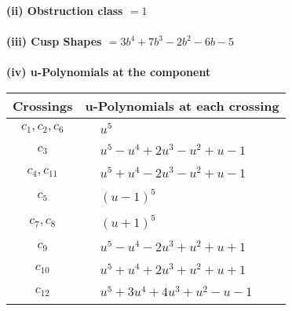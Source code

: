 \documentclass[1p]{elsarticle_modified}
\theoremstyle{definition}
\begin{document}
\flushleft \textbf{(ii) Obstruction class $= 1$}\\~\\
\flushleft \textbf{(iii) Cusp Shapes $= 3 b^4+7 b^3-2 b^2-6 b-5$}\\~\\
\newpage\renewcommand{\arraystretch}{1}
\flushleft \textbf{(iv) u-Polynomials at the component}\newline \\
\begin{tabular}{m{50pt}|m{274pt}}
Crossings & \hspace{64pt}u-Polynomials at each crossing \\
\hline $$\begin{aligned}c_{1},c_{2},c_{6}\end{aligned}$$&$\begin{aligned}
&u^5
\end{aligned}$\\
\hline $$\begin{aligned}c_{3}\end{aligned}$$&$\begin{aligned}
&u^5- u^4+2 u^3- u^2+u-1
\end{aligned}$\\
\hline $$\begin{aligned}c_{4},c_{11}\end{aligned}$$&$\begin{aligned}
&u^5+u^4-2 u^3- u^2+u-1
\end{aligned}$\\
\hline $$\begin{aligned}c_{5}\end{aligned}$$&$\begin{aligned}
&(u-1)^5
\end{aligned}$\\
\hline $$\begin{aligned}c_{7},c_{8}\end{aligned}$$&$\begin{aligned}
&(u+1)^5
\end{aligned}$\\
\hline $$\begin{aligned}c_{9}\end{aligned}$$&$\begin{aligned}
&u^5- u^4-2 u^3+u^2+u+1
\end{aligned}$\\
\hline $$\begin{aligned}c_{10}\end{aligned}$$&$\begin{aligned}
&u^5+u^4+2 u^3+u^2+u+1
\end{aligned}$\\
\hline $$\begin{aligned}c_{12}\end{aligned}$$&$\begin{aligned}
&u^5+3 u^4+4 u^3+u^2- u-1
\end{aligned}$\\
\hline
\end{tabular}\\~\\
\end{document}
